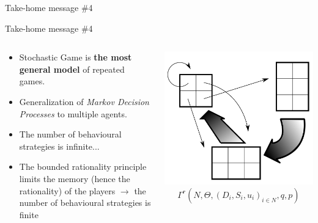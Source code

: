 \begin{frame}{Take-home message \#4}

    \begin{block}{Take-home message \#4}
        \begin{columns}
            \begin{column}{0.55\textwidth}
                \begin{itemize}
                    \item Stochastic Game is \textbf{the most general model} of
                    repeated games.
                    \item Generalization of \textit{Markov Decision Processes}
                    to multiple agents.
                    \item {\color{orange}The number of behavioural strategies is infinite}...
                    \item The bounded rationality principle limits the memory (hence
                    the rationality) of the players
                    $\to$ {\color{green}the number of behavioural strategies is finite}
                \end{itemize}
            \end{column}
            \begin{column}{0.3\textwidth}
                \begin{center}
                    \includegraphics[width=\textwidth]{img/stochastic.png}
                    \scriptsize{\[ \Gamma^r(N, \Theta, (D_i, S_i, u_i)_{i \in N}, q, p) \]}
                \end{center}
            \end{column}
        \end{columns}

    \end{block}
\end{frame}
